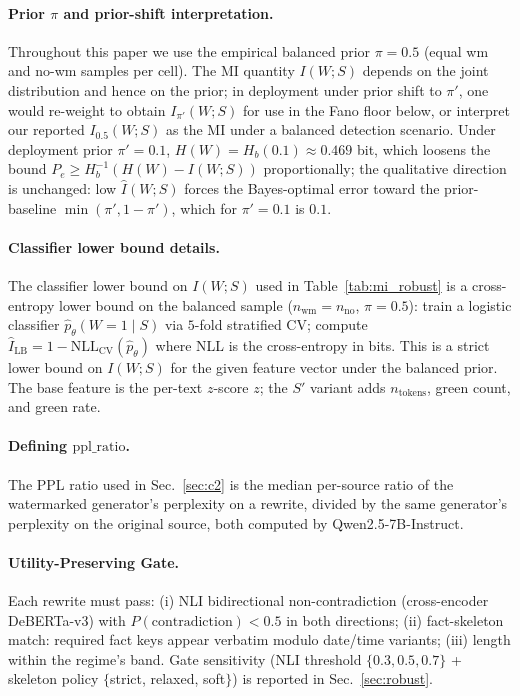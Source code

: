 \documentclass[11pt]{article}
\begin{document}
\paragraph{Prior $\pi$ and prior-shift interpretation.}
Throughout this paper we use the empirical balanced prior $\pi{=}0.5$
(equal wm and no-wm samples per cell). The MI quantity $I(W;S)$ depends on
the joint distribution and hence on the prior; in deployment under prior
shift to $\pi'$, one would re-weight to obtain $I_{\pi'}(W;S)$ for use in
the Fano floor below, or interpret our reported $I_{0.5}(W;S)$ as the MI
under a balanced detection scenario. Under deployment prior $\pi'{=}0.1$,
$H(W)\!=\!H_b(0.1)\!\approx\!0.469$ bit, which loosens the bound
$P_e \ge H_b^{-1}(H(W)-I(W;S))$ proportionally; the qualitative direction
is unchanged: low $\hat I(W;S)$ forces the Bayes-optimal error toward the
prior-baseline $\min(\pi',1{-}\pi')$, which for $\pi'{=}0.1$ is $0.1$.

\paragraph{Classifier lower bound details.}
The classifier lower bound on $I(W;S)$ used in Table~\ref{tab:mi_robust} is
a cross-entropy lower bound on the balanced sample ($n_{\text{wm}}{=}n_{\text{no}}$,
$\pi{=}0.5$): train a logistic classifier $\hat p_\theta(W{=}1\mid S)$ via
$5$-fold stratified CV; compute
$\hat I_{\text{LB}} = 1 - \mathrm{NLL}_{\text{CV}}(\hat p_\theta)$
where NLL is the cross-entropy in bits. This is a strict lower bound on
$I(W;S)$ for the given feature vector under the balanced prior. The base
feature is the per-text $z$-score $z$; the $S'$ variant adds
$n_{\text{tokens}}$, green count, and green rate.

\paragraph{Defining $\text{ppl\_ratio}$.} The PPL ratio used in
Sec.~\ref{sec:c2} is the median per-source ratio of the watermarked
generator's perplexity on a rewrite, divided by the same generator's
perplexity on the original source, both computed by Qwen2.5-7B-Instruct.

\paragraph{Utility-Preserving Gate.}
\label{sec:gate}
Each rewrite must pass: (i) NLI bidirectional non-contradiction
(cross-encoder DeBERTa-v3) with $P(\text{contradiction})<0.5$ in both
directions; (ii) fact-skeleton match: required fact keys appear verbatim
modulo date/time variants; (iii) length within the regime's band.
Gate sensitivity (NLI threshold $\{0.3, 0.5, 0.7\}$ + skeleton policy
$\{$strict, relaxed, soft$\}$) is reported in Sec.~\ref{sec:robust}.
\end{document}
